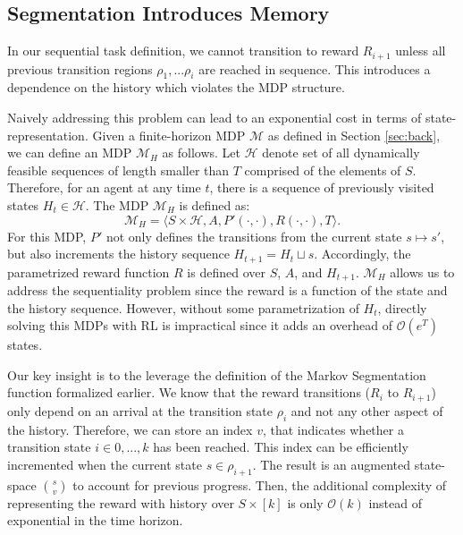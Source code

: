 \subsection{Segmentation Introduces Memory}
In our sequential task definition, we cannot transition to reward $R_{i+1}$ unless all previous transition regions $\rho_{1},...\rho_{i}$ are reached in sequence.
This introduces a dependence on the history which violates the MDP structure.

Naively addressing this problem can lead to an exponential cost in terms of state-representation.
Given a finite-horizon MDP $\mathcal{M}$ as defined in Section \ref{sec:back}, we can define an MDP $\mathcal{M}_H$ as follows.
Let $\mathcal{H}$ denote set of all dynamically feasible sequences of length smaller than $T$ comprised of the elements of $S$.
Therefore, for an agent at any time $t$, there is a sequence of previously visited states $H_t \in \mathcal{H}$.
The MDP $\mathcal{M}_H$ is defined as:
\[
\mathcal{M}_H = \langle S \times \mathcal{H},A,P'(\cdot,\cdot), R(\cdot,\cdot),T \rangle.
\]
For this MDP, $P'$ not only defines the transitions from the current state $s \mapsto s'$, but also increments the history sequence $H_{t+1} = H_{t} \sqcup s$.
Accordingly, the parametrized reward function $R$ is defined over $S$, $A$, and $H_{t+1}$.
$\mathcal{M}_H$ allows us to address the sequentiality problem since the reward is a function of the state and the history sequence.
However, without some parametrization of $H_t$, directly solving this MDPs with RL is impractical since it adds an overhead of $\mathcal{O}(e^{T})$ states.

Our key insight is to the leverage the definition of the Markov Segmentation function formalized earlier.
We know that the reward transitions ($R_{i}$ to $R_{i+1}$) only depend on an arrival at the transition state $\rho_{i}$ and not any other aspect of the history.
Therefore, we can store an index $v$, that indicates whether a transition state $i \in 0,...,k$ has been reached.
This index can be efficiently incremented when the current state $s \in \rho_{i+1}$.
The result is an augmented state-space $\binom{s}{v}$ to account for previous progress.
Then, the additional complexity of representing the reward with history over $S \times  [k]$ is only $\mathcal{O}(k)$ instead of exponential in the time horizon.

